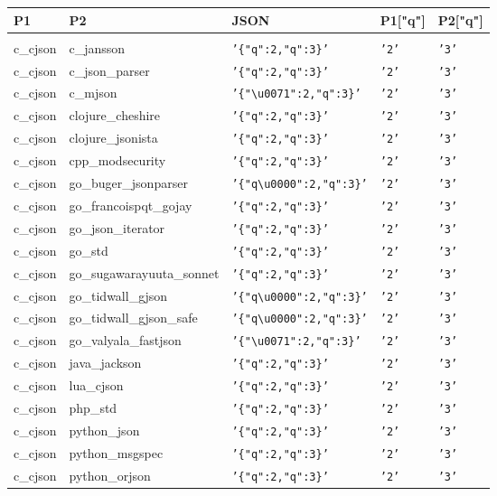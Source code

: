 \documentclass[english, 12pt, a4paper, sci, utf8, a-2b, online]{aaltothesis}
\def\str#1{\texttt{'#1'}}
\begin{document}
\scriptsize
\begin{longtable}{lllll}
    P1 & P2 & JSON & P1["q"] & P2["q"] \\
    \hline \\
    c\_cjson & c\_jansson & \str{\{"q":2,"q":3\}} & \str{2} & \str{3} \\
    c\_cjson & c\_json\_parser & \str{\{"q":2,"q":3\}} & \str{2} & \str{3} \\
    c\_cjson & c\_mjson & \str{\{"\textbackslash u0071":2,"q":3\}} & \str{2} & \str{3} \\
    c\_cjson & clojure\_cheshire & \str{\{"q":2,"q":3\}} & \str{2} & \str{3} \\
    c\_cjson & clojure\_jsonista & \str{\{"q":2,"q":3\}} & \str{2} & \str{3} \\
    c\_cjson & cpp\_modsecurity & \str{\{"q":2,"q":3\}} & \str{2} & \str{3} \\
    c\_cjson & go\_buger\_jsonparser & \str{\{"q\textbackslash u0000":2,"q":3\}} & \str{2} & \str{3} \\
    c\_cjson & go\_francoispqt\_gojay & \str{\{"q":2,"q":3\}} & \str{2} & \str{3} \\
    c\_cjson & go\_json\_iterator & \str{\{"q":2,"q":3\}} & \str{2} & \str{3} \\
    c\_cjson & go\_std & \str{\{"q":2,"q":3\}} & \str{2} & \str{3} \\
    c\_cjson & go\_sugawarayuuta\_sonnet & \str{\{"q":2,"q":3\}} & \str{2} & \str{3} \\
    c\_cjson & go\_tidwall\_gjson & \str{\{"q\textbackslash u0000":2,"q":3\}} & \str{2} & \str{3} \\
    c\_cjson & go\_tidwall\_gjson\_safe & \str{\{"q\textbackslash u0000":2,"q":3\}} & \str{2} & \str{3} \\
    c\_cjson & go\_valyala\_fastjson & \str{\{"\textbackslash u0071":2,"q":3\}} & \str{2} & \str{3} \\
    c\_cjson & java\_jackson & \str{\{"q":2,"q":3\}} & \str{2} & \str{3} \\
    c\_cjson & lua\_cjson & \str{\{"q":2,"q":3\}} & \str{2} & \str{3} \\
    c\_cjson & php\_std & \str{\{"q":2,"q":3\}} & \str{2} & \str{3} \\
    c\_cjson & python\_json & \str{\{"q":2,"q":3\}} & \str{2} & \str{3} \\
    c\_cjson & python\_msgspec & \str{\{"q":2,"q":3\}} & \str{2} & \str{3} \\
    c\_cjson & python\_orjson & \str{\{"q":2,"q":3\}} & \str{2} & \str{3} \\

\end{longtable}
\end{document}
